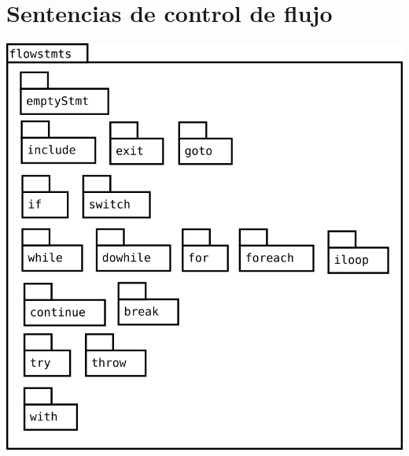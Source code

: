 
\pagebreak

\pagebreak

\section {Sentencias de control de flujo}
\begin{center}
\includegraphics[scale=0.4]{flowstmts.png} \\
\end{center}
